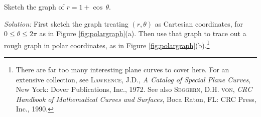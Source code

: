 
\begin{exmp}\label{exmp:polaronepluscos}
 Sketch the graph of $r = 1 + \cos\,\theta$.\vspace{1mm}
 \par\noindent\emph{Solution:} First sketch the graph treating $(r,\theta)$ as
 Cartesian coordinates, for $0 \le \theta \le 2\pi$ as in Figure
 \ref{fig:polargraph}(a). Then use that graph to trace out a rough graph in
 polar coordinates, as in Figure \ref{fig:polargraph}(b).\footnote{There are
far too many interesting plane curves to
cover here. For an extensive collection, see \textsc{Lawrence, J.D.},
\emph{A Catalog of Special Plane Curves}, New York: Dover Publications, Inc.,
1972. See also \textsc{Seggern, D.H. von}, \emph{CRC Handbook of Mathematical
Curves and Surfaces}, Boca Raton, FL: CRC Press, Inc., 1990.}


\end{exmp}
